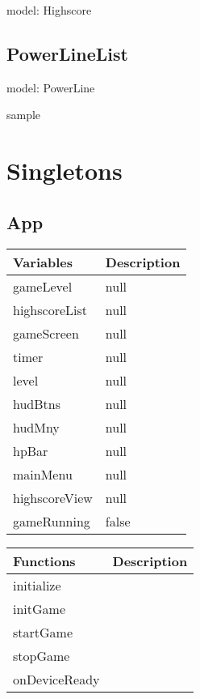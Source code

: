 	
	model: Highscore

	

\subsection*{PowerLineList}

	model: PowerLine

	sample

\clearpage

\section{Singletons}

\subsection*{App}

	\begin{table}[H]
	\begin{tabular}{p{4cm} | p{8cm} }
	\hline
	\rowcolor{gray}
	Variables & Description \\ \hline
	gameLevel & null \\ \hline
  	highscoreList & null \\ \hline
  	gameScreen & null \\ \hline
  	timer & null \\ \hline
  	level & null \\ \hline
  	hudBtns & null \\ \hline
  	hudMny & null \\ \hline
  	hpBar & null \\ \hline
  	mainMenu & null \\ \hline
  	highscoreView & null \\ \hline
  	gameRunning & false \\ \hline
	
	\end{tabular}
	\end{table}

	\begin{table}[H]
	\begin{tabular}{p{4cm} | p{8cm} }
	\hline
	\rowcolor{gray}
	Functions & Description \\ \hline
	initialize & \\ \hline
  	initGame & \\ \hline
  	startGame & \\ \hline
  	stopGame & \\ \hline
  	onDeviceReady & \\ \hline

	\end{tabular}
	\end{table}

